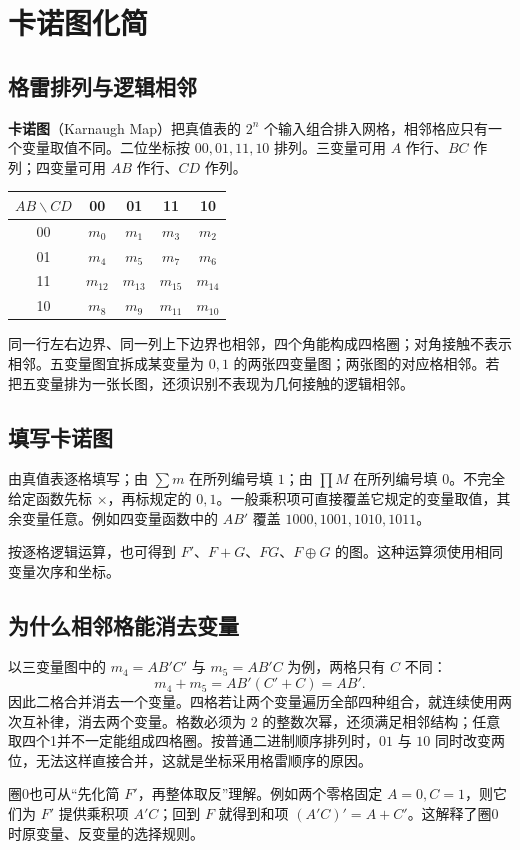 \documentclass[UTF8,fontset=none,zihao=-4,a4paper]{ctexart}
\newcommand{\chapterpage}[1]{\clearpage\section{#1}}
\newcommand{\term}[1]{\textbf{#1}}
\begin{document}
\chapterpage{卡诺图化简}
\subsection{格雷排列与逻辑相邻}
\term{卡诺图}（Karnaugh Map）把真值表的 $2^n$ 个输入组合排入网格，相邻格应只有一个变量取值不同。二位坐标按 $00,01,11,10$ 排列。三变量可用 $A$ 作行、$BC$ 作列；四变量可用 $AB$ 作行、$CD$ 作列。
\begin{center}
\begin{tabular}{c cccc}
\toprule $AB\backslash CD$&00&01&11&10\\\midrule
00&$m_0$&$m_1$&$m_3$&$m_2$\\
01&$m_4$&$m_5$&$m_7$&$m_6$\\
11&$m_{12}$&$m_{13}$&$m_{15}$&$m_{14}$\\
10&$m_8$&$m_9$&$m_{11}$&$m_{10}$\\\bottomrule
\end{tabular}
\end{center}
同一行左右边界、同一列上下边界也相邻，四个角能构成四格圈；对角接触不表示相邻。五变量图宜拆成某变量为 $0,1$ 的两张四变量图；两张图的对应格相邻。若把五变量排为一张长图，还须识别不表现为几何接触的逻辑相邻。

\subsection{填写卡诺图}
由真值表逐格填写；由 $\sum m$ 在所列编号填 $1$；由 $\prod M$ 在所列编号填 $0$。不完全给定函数先标 $\times$，再标规定的 $0,1$。一般乘积项可直接覆盖它规定的变量取值，其余变量任意。例如四变量函数中的 $AB'$ 覆盖 $1000,1001,1010,1011$。

按逐格逻辑运算，也可得到 $F'$、$F+G$、$FG$、$F\oplus G$ 的图。这种运算须使用相同变量次序和坐标。

\subsection{为什么相邻格能消去变量}
以三变量图中的 $m_4=AB'C'$ 与 $m_5=AB'C$ 为例，两格只有 $C$ 不同：
\[
m_4+m_5=AB'(C'+C)=AB'.
\]
因此二格合并消去一个变量。四格若让两个变量遍历全部四种组合，就连续使用两次互补律，消去两个变量。格数必须为 $2$ 的整数次幂，还须满足相邻结构；任意取四个1并不一定能组成四格圈。按普通二进制顺序排列时，$01$ 与 $10$ 同时改变两位，无法这样直接合并，这就是坐标采用格雷顺序的原因。

圈0也可从“先化简 $F'$，再整体取反”理解。例如两个零格固定 $A=0,C=1$，则它们为 $F'$ 提供乘积项 $A'C$；回到 $F$ 就得到和项 $(A'C)'=A+C'$。这解释了圈0时原变量、反变量的选择规则。
\end{document}

